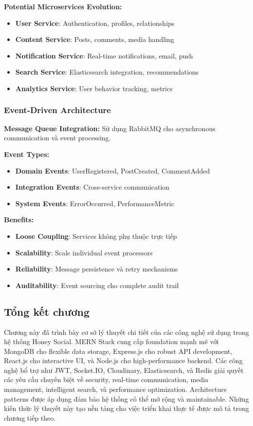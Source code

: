 \textbf{Potential Microservices Evolution:}
\begin{itemize}
\item \textbf{User Service}: Authentication, profiles, relationships
\item \textbf{Content Service}: Posts, comments, media handling
\item \textbf{Notification Service}: Real-time notifications, email, push
\item \textbf{Search Service}: Elasticsearch integration, recommendations
\item \textbf{Analytics Service}: User behavior tracking, metrics
\end{itemize}

\subsubsection{Event-Driven Architecture}
\textbf{Message Queue Integration:}
Sử dụng RabbitMQ cho asynchronous communication và event processing.

\textbf{Event Types:}
\begin{itemize}
\item \textbf{Domain Events}: UserRegistered, PostCreated, CommentAdded
\item \textbf{Integration Events}: Cross-service communication
\item \textbf{System Events}: ErrorOccurred, PerformanceMetric
\end{itemize}

\textbf{Benefits:}
\begin{itemize}
\item \textbf{Loose Coupling}: Services không phụ thuộc trực tiếp
\item \textbf{Scalability}: Scale individual event processors
\item \textbf{Reliability}: Message persistence và retry mechanisms
\item \textbf{Auditability}: Event sourcing cho complete audit trail
\end{itemize}

\subsection{Tổng kết chương}
Chương này đã trình bày cơ sở lý thuyết chi tiết của các công nghệ sử dụng trong hệ thống Honey Social. MERN Stack cung cấp foundation mạnh mẽ với MongoDB cho flexible data storage, Express.js cho robust API development, React.js cho interactive UI, và Node.js cho high-performance backend. Các công nghệ bổ trợ như JWT, Socket.IO, Cloudinary, Elasticsearch, và Redis giải quyết các yêu cầu chuyên biệt về security, real-time communication, media management, intelligent search, và performance optimization. Architecture patterns được áp dụng đảm bảo hệ thống có thể mở rộng và maintainable. Những kiến thức lý thuyết này tạo nền tảng cho việc triển khai thực tế được mô tả trong chương tiếp theo.
